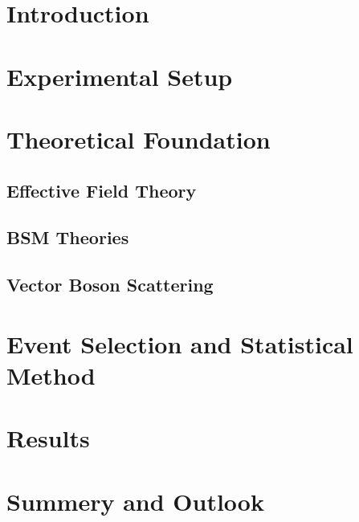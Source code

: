\tableofcontents
\printnoidxglossary[type=acronym]
\printacronyms

\chapter{Introduction}


\chapter{Experimental Setup}


\chapter{Theoretical Foundation}
\label{chapter:Theory}
\section{Effective Field Theory}


\section{BSM Theories}


\section{Vector Boson Scattering}


\chapter{Event Selection and Statistical Method}
\label{chapter:Event_and_stat}


\chapter{Results}


\chapter{Summery and Outlook}



\newpage
\nocite{*}
\printbibliography

\listoffigures
\listoftables

